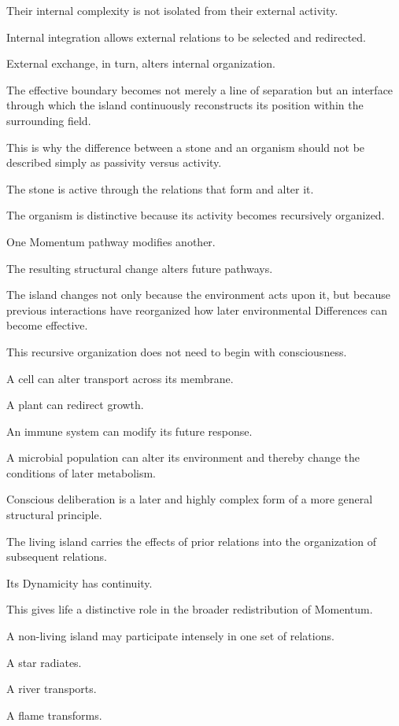 Their internal complexity is not isolated from their external activity.

Internal integration allows external relations to be selected and redirected.

External exchange, in turn, alters internal organization.

The effective boundary becomes not merely a line of separation but an interface through which the island continuously reconstructs its position within the surrounding field.

This is why the difference between a stone and an organism should not be described simply as passivity versus activity.

The stone is active through the relations that form and alter it.

The organism is distinctive because its activity becomes recursively organized.

One Momentum pathway modifies another.

The resulting structural change alters future pathways.

The island changes not only because the environment acts upon it, but because previous interactions have reorganized how later environmental Differences can become effective.

This recursive organization does not need to begin with consciousness.

A cell can alter transport across its membrane.

A plant can redirect growth.

An immune system can modify its future response.

A microbial population can alter its environment and thereby change the conditions of later metabolism.

Conscious deliberation is a later and highly complex form of a more general structural principle.

The living island carries the effects of prior relations into the organization of subsequent relations.

Its Dynamicity has continuity.

This gives life a distinctive role in the broader redistribution of Momentum.

A non-living island may participate intensely in one set of relations.

A star radiates.

A river transports.

A flame transforms.

